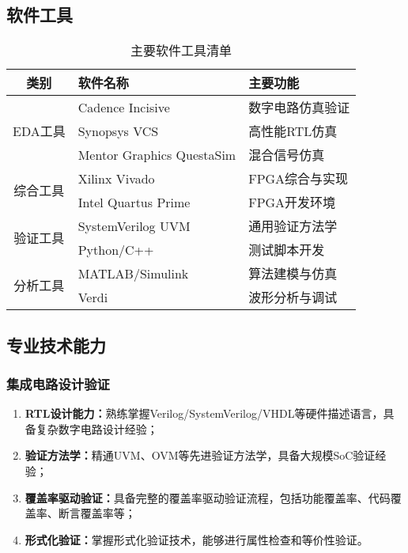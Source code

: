 \documentclass[fontset=windows]{article}
\begin{document}
\subsection{软件工具}

\begin{table}[H]
    \centering
    \begin{tabular}{|c|l|l|}
        \hline
        类别 & 软件名称 & 主要功能 \\
        \hline
        \multirow{3}{*}{EDA工具} & Cadence Incisive & 数字电路仿真验证 \\
        & Synopsys VCS & 高性能RTL仿真 \\
        & Mentor Graphics QuestaSim & 混合信号仿真 \\
        \hline
        \multirow{2}{*}{综合工具} & Xilinx Vivado & FPGA综合与实现 \\
        & Intel Quartus Prime & FPGA开发环境 \\
        \hline
        \multirow{2}{*}{验证工具} & SystemVerilog UVM & 通用验证方法学 \\
        & Python/C++ & 测试脚本开发 \\
        \hline
        \multirow{2}{*}{分析工具} & MATLAB/Simulink & 算法建模与仿真 \\
        & Verdi & 波形分析与调试 \\
        \hline
    \end{tabular}
    \caption{主要软件工具清单}
    \label{tab:software-tools}
\end{table}

\subsection{专业技术能力}

\subsubsection{集成电路设计验证}
\begin{enumerate}[label=(\arabic*)]
    \item \textbf{RTL设计能力：}熟练掌握Verilog/SystemVerilog/VHDL等硬件描述语言，具备复杂数字电路设计经验；
    \item \textbf{验证方法学：}精通UVM、OVM等先进验证方法学，具备大规模SoC验证经验；
    \item \textbf{覆盖率驱动验证：}具备完整的覆盖率驱动验证流程，包括功能覆盖率、代码覆盖率、断言覆盖率等；
    \item \textbf{形式化验证：}掌握形式化验证技术，能够进行属性检查和等价性验证。
\end{enumerate}
\end{document}
